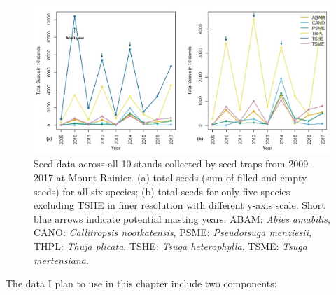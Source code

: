 \documentclass[11pt,letter]{article}
\begin{document}
\begin{figure}[!h]
	\centering
	\includegraphics[width=1\linewidth]{Seed1.jpg}
	\caption{Seed data across all 10 stands collected by seed traps from 2009-2017 at Mount Rainier. (a) total seeds (sum of filled and empty seeds) for all six species; (b) total seeds for only five species excluding TSHE in finer resolution with different y-axis scale. Short blue arrows indicate potential masting years. ABAM: \textit{Abies amabilis}, CANO:  \textit{Callitropsis nootkatensis}, PSME: \textit{Pseudotsuga menziesii}, THPL: \textit{Thuja plicata}, TSHE: \textit{Tsuga heterophylla}, TSME: \textit{Tsuga mertensiana}.}
	\label{fig:seed}
\end{figure}
The data I plan to use in this chapter include two components:
\end{document}

